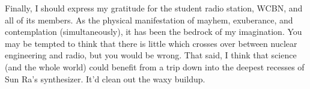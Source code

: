 Finally, I should express my gratitude for the student radio station, WCBN, and
all of its members. As the physical manifestation of mayhem, exuberance, and
contemplation (simultaneously), it has been the bedrock of my imagination. You
may be tempted to think that there is little which crosses over between nuclear
engineering and radio, but you would be wrong. That said, I think that science
(and the whole world) could benefit from a trip down into the deepest recesses
of Sun Ra's synthesizer. It'd clean out the waxy buildup.

